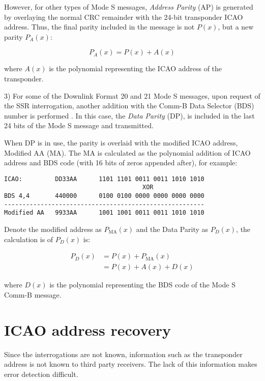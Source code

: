 However, for other types of Mode S messages, \emph{Address Parity} (AP) is generated by overlaying the normal CRC remainder with the 24-bit transponder ICAO address. Thus, the final parity included in the message is not $P(x)$, but a new parity $P_A(x)$:

\begin{equation}
  P_A(x) = P(x) + A(x)
\end{equation}

\noindent where $A(x)$ is the polynomial representing the ICAO address of the transponder.

3) For some of the Downlink Format 20 and 21 Mode S messages, upon request of the SSR interrogation, another addition with the Comm-B Data Selector (BDS) number is performed \cite{gertz1984}. In this case, the \emph{Data Parity} (DP), is included in the last 24 bits of the Mode S message and transmitted.

When DP is in use, the parity is overlaid with the modified ICAO address, Modified AA (MA). The MA is calculated as the polynomial addition of ICAO address and BDS code (with 16 bits of zeros appended after), for example:

\begin{verbatim}
ICAO:         DD33AA      1101 1101 0011 0011 1010 1010
                                      XOR
BDS 4,4       440000      0100 0100 0000 0000 0000 0000
-------------------------------------------------------
Modified AA   9933AA      1001 1001 0011 0011 1010 1010
\end{verbatim}


Denote the modified address as $P_\mathrm{MA}(x)$ and the Data Parity as $P_D(x)$, the calculation is of $P_D(x)$ is:

\begin{equation}
  \begin{split}
    P_D(x) &= P(x) + P_\mathrm{MA}(x) \\
     &= P(x) + A(x) + D(x)
  \end{split}
\end{equation}

\noindent where $D(x)$ is the polynomial representing the BDS code of the Mode S Comm-B message.


\section{ICAO address recovery}

Since the interrogations are not known, information such as the transponder address is not known to third party receivers. The lack of this information makes error detection difficult.


